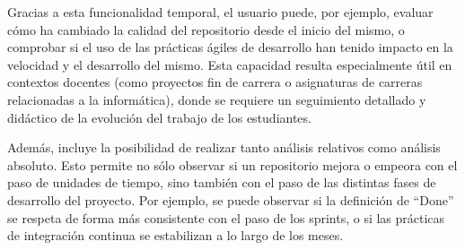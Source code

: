 Gracias a esta funcionalidad temporal, el usuario puede, por ejemplo, evaluar cómo ha cambiado la calidad del repositorio desde el inicio del mismo, o comprobar si el uso de las prácticas ágiles de desarrollo han tenido impacto en la velocidad y el desarrollo del mismo. Esta capacidad resulta especialmente útil en contextos docentes (como proyectos fin de carrera o asignaturas de carreras relacionadas a la informática), donde se requiere un seguimiento detallado y didáctico de la evolución del trabajo de los estudiantes.

Además, incluye la posibilidad de realizar tanto análisis relativos como análisis absoluto. Esto permite no sólo observar si un repositorio mejora o empeora con el paso de unidades de tiempo, sino también con el paso de las distintas fases de desarrollo del proyecto. Por ejemplo, se puede observar si la definición de ``Done'' se respeta de forma más consistente con el paso de los sprints, o si las prácticas de integración continua se estabilizan a lo largo de los meses.